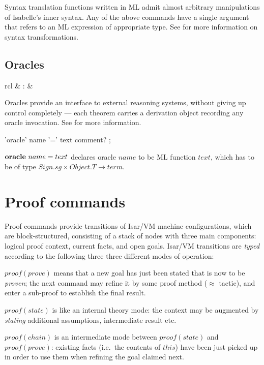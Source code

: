 Syntax translation functions written in ML admit almost arbitrary
manipulations of Isabelle's inner syntax.  Any of the above commands have a
single  argument that refers to an ML expression of
appropriate type.  See \cite[\S8]{isabelle-ref} for more information on syntax
transformations.


\subsection{Oracles}

\begin{matharray}{rcl}
   & : &  \\
\end{matharray}

Oracles provide an interface to external reasoning systems, without giving up
control completely --- each theorem carries a derivation object recording any
oracle invocation.  See \cite[\S6]{isabelle-ref} for more information.

\begin{rail}
  'oracle' name '=' text comment?
  ;
\end{rail}

\begin{descr}
\item [${\mathord{\mathbf{oracle}}}~name=text$] declares oracle $name$ to be ML
  function $text$, which has to be of type $Sign\mathord.sg \times
  Object\mathord.T \to term$.
\end{descr}


\section{Proof commands}

Proof commands provide transitions of Isar/VM machine configurations, which
are block-structured, consisting of a stack of nodes with three main
components: logical proof context, current facts, and open goals.  Isar/VM
transitions are \emph{typed} according to the following three three different
modes of operation:
\begin{descr}
\item [$proof(prove)$] means that a new goal has just been stated that is now
  to be \emph{proven}; the next command may refine it by some proof method
  ($\approx$ tactic), and enter a sub-proof to establish the final result.
\item [$proof(state)$] is like an internal theory mode: the context may be
  augmented by \emph{stating} additional assumptions, intermediate result etc.
\item [$proof(chain)$] is an intermediate mode between $proof(state)$ and
  $proof(prove)$: existing facts (i.e.\ the contents of $this$) have been just
  picked up in order to use them when refining the goal claimed next.
\end{descr}


